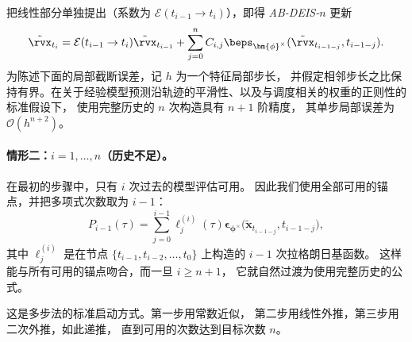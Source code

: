 把线性部分单独提出（系数为
$\mathcal{E}(t_{i-1}\to t_i)$），即得 \emph{AB-DEIS-$n$} 更新
\[
\tilde\rvx_{t_i}
=
\mathcal{E}(t_{i-1}\to t_i)\tilde\rvx_{t_{i-1}}
+
\sum_{j=0}^{n}
C_{i,j}
\beps_{\bm{\phi}^\times}
(\tilde\rvx_{t_{i-1-j}},t_{i-1-j}).
\]
为陈述下面的局部截断误差，记 $h$ 为一个特征局部步长，
并假定相邻步长之比保持有界。在关于经验模型预测沿轨迹的平滑性、以及与调度相关的权重的正则性的标准假设下，
使用完整历史的 $n$ 次构造具有 $n+1$ 阶精度，
其单步局部误差为 $\mathcal O(h^{n+2})$。


\paragraph{情形二：$i=1,\dots,n$（历史不足）。}
在最初的步骤中，只有 $i$ 次过去的模型评估可用。
因此我们使用全部可用的锚点，并把多项式次数取为 $i{-}1$：
\[
P_{i-1}(\tau)
=
\sum_{j=0}^{i-1}
\ell_j^{(i)}(\tau)
\bm{\epsilon}_{\bm{\phi}^\times}\bigl(\tilde{\mathbf x}_{t_{i-1-j}},  t_{i-1-j}\bigr),
\]
其中 $\ell_j^{(i)}$ 是在节点
$\{t_{i-1}, t_{i-2},\ldots,t_{0}\}$ 上构造的 $i{-}1$ 次拉格朗日基函数。
这样能与所有可用的锚点吻合，而一旦 $i\ge n{+}1$，
它就自然过渡为使用完整历史的公式。

这是多步法的标准启动方式。第一步用常数近似，
第二步用线性外推，第三步用二次外推，如此递推，
直到可用的次数达到目标次数 $n$。



